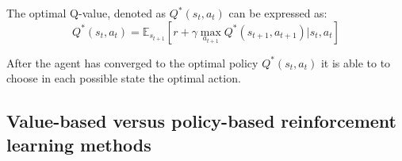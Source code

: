 




The optimal Q-value, denoted as $Q^* (s_t, a_t)$ can be expressed as:
\begin{equation} \label{eq:1}
Q^* (s_t, a_t) = \mathbb{E}_{s_{t+1}} [r + \gamma \max_{a_{t+1}} Q^*(s_{t+1}, a_{t+1}) | s_t, a_t]
\end{equation}

After the agent has converged to the optimal policy $Q^* (s_t, a_t)$ it is able to to choose in each possible state the optimal action.\\







\subsection{Value-based versus policy-based reinforcement learning methods}



